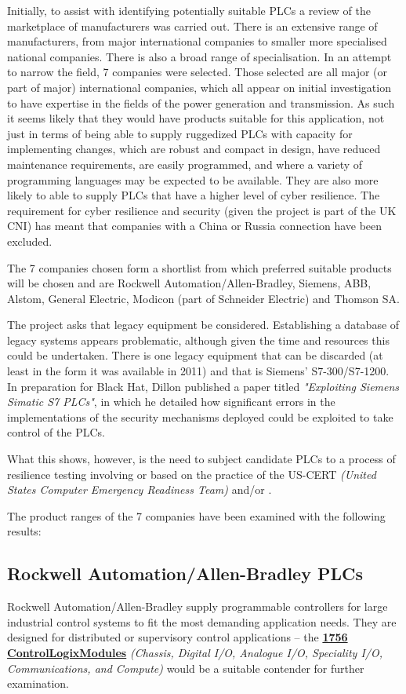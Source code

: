 Initially, to assist with identifying potentially suitable PLCs a review of the marketplace of manufacturers was carried out. There is an extensive range of manufacturers, from major international companies to smaller more specialised national companies. There is also a broad range of specialisation. In an attempt to narrow the field, 7 companies were selected. Those selected are all major (or part of major) international companies, which all appear on initial investigation to have expertise in the fields of the power generation and transmission. As such it seems likely that they would have products suitable for this application, not just in terms of being able to supply ruggedized PLCs with capacity for implementing changes, which are robust and compact in design, have reduced maintenance requirements, are easily programmed, and where a variety of programming languages may be expected to be available. They are also more likely to able to supply PLCs that have a higher level of cyber resilience. The requirement for cyber resilience and security (given the project is part of the UK CNI) has meant that companies with a China or Russia connection have been excluded.

The 7 companies chosen form a shortlist from which preferred suitable products will be chosen and are Rockwell Automation/Allen-Bradley, Siemens, ABB, Alstom, General Electric, Modicon (part of Schneider Electric) and Thomson SA.

The project asks that legacy equipment be considered. Establishing a database of legacy systems appears problematic, although given the time and resources this could be undertaken. There is one legacy equipment that can be discarded (at least in the form it was available in 2011) and that is Siemens' S7-300/S7-1200. In preparation for Black Hat, Dillon \citet{pdf:blackhat:siemensscada:20110711} published a paper titled \textit{"Exploiting Siemens Simatic S7 PLCs"}, in which he detailed how significant errors in the implementations of the security mechanisms deployed could be exploited to take control of the PLCs.

What this shows, however, is the need to subject candidate PLCs to a process of resilience testing involving or based on the practice of the US-CERT \textit{(United States Computer Emergency Readiness Team)} and/or \citet{site:ics-cert:standards:20180427}.

The product ranges of the 7 companies have been examined with the following results:
\subsection{Rockwell Automation/Allen-Bradley PLCs}
Rockwell Automation/Allen-Bradley supply programmable controllers for large industrial control systems to fit the most demanding application needs. They are designed for distributed or supervisory control applications -- the \href{https://ab.rockwellautomation.com/IO/Chassis-Based/1756-ControlLogix-IO}{\textbf{1756 ControlLogix\textregistered Modules}} \textit{(Chassis, Digital I/O, Analogue I/O, Speciality I/O, Communications, and Compute)} would be a suitable contender for further examination.

